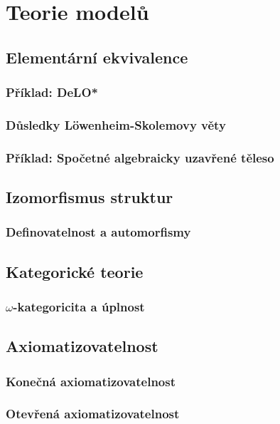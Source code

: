 \chapter{Teorie modelů}


\section{Elementární ekvivalence}

\subsection{Příklad: DeLO*}


\subsection{Důsledky Löwenheim-Skolemovy věty}

\subsection{Příklad: Spočetné algebraicky uzavřené těleso}


\section{Izomorfismus struktur}\label{section:isomorphism-of-structures}

\subsection{Definovatelnost a automorfismy}

\section{Kategorické teorie}

\subsection{$\omega$-kategoricita a úplnost}

\section{Axiomatizovatelnost}

\subsection{Konečná axiomatizovatelnost}

\subsection{Otevřená axiomatizovatelnost}